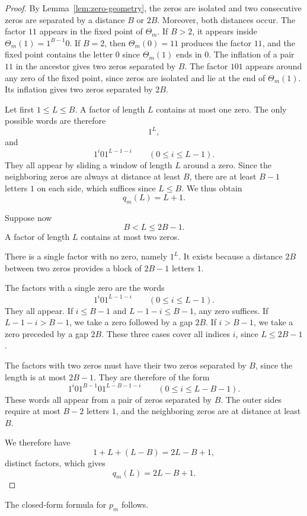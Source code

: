 \documentclass[12pt,reqno]{article}
\theoremstyle{plain}
\theoremstyle{definition}
\begin{document}
\begin{proof}
By Lemma~\ref{lem:zero-geometry}, the zeros are isolated and two consecutive zeros are separated by a distance $B$ or $2B$. Moreover, both distances occur. The factor $11$ appears in the fixed point of $\Theta_m$. If $B > 2$, it appears inside $\Theta_m(1) = 1^{B-1} 0$. If $B = 2$, then $\Theta_m(0) = 11$ produces the factor $11$, and the fixed point contains the letter $0$ since $\Theta_m(1)$ ends in $0$. The inflation of a pair $11$ in the ancestor gives two zeros separated by $B$. The factor $101$ appears around any zero of the fixed point, since zeros are isolated and lie at the end of $\Theta_m(1)$. Its inflation gives two zeros separated by $2B$.

Let first $1 \le L \le B$. A factor of length $L$ contains at most one zero. The only possible words are therefore
\[
  1^L,
\]
and
\[
  1^i 0 1^{L-1-i} \qquad (0 \le i \le L - 1).
\]
They all appear by sliding a window of length $L$ around a zero. Since the neighboring zeros are always at distance at least $B$, there are at least $B - 1$ letters $1$ on each side, which suffices since $L \le B$. We thus obtain
\[
  q_m(L) = L + 1.
\]

Suppose now
\[
  B < L \le 2B - 1.
\]
A factor of length $L$ contains at most two zeros.

There is a single factor with no zero, namely $1^L$. It exists because a distance $2B$ between two zeros provides a block of $2B - 1$ letters $1$.

The factors with a single zero are the words
\[
  1^i 0 1^{L-1-i} \qquad (0 \le i \le L - 1).
\]
They all appear. If $i \le B - 1$ and $L - 1 - i \le B - 1$, any zero suffices. If $L - 1 - i > B - 1$, we take a zero followed by a gap $2B$. If $i > B - 1$, we take a zero preceded by a gap $2B$. These three cases cover all indices $i$, since $L \le 2B - 1$.

The factors with two zeros must have their two zeros separated by $B$, since the length is at most $2B - 1$. They are therefore of the form
\[
  1^i 0 1^{B-1} 0 1^{L-B-1-i} \qquad (0 \le i \le L - B - 1).
\]
These words all appear from a pair of zeros separated by $B$. The outer sides require at most $B - 2$ letters $1$, and the neighboring zeros are at distance at least $B$.

We therefore have
\[
  1 + L + (L - B) = 2L - B + 1,
\]
distinct factors, which gives
\[
  q_m(L) = 2L - B + 1.
\]
\end{proof}

The closed-form formula for $p_m$ follows.
\end{document}
